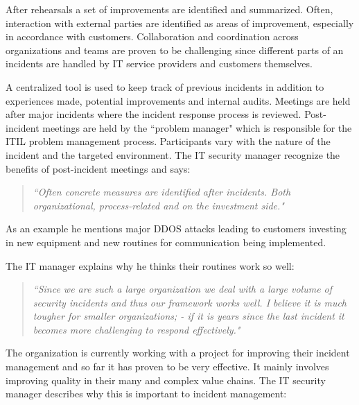 After rehearsals a set of improvements are identified and summarized. Often, interaction with external parties are identified as areas of improvement, especially in accordance with customers. Collaboration and coordination across organizations and teams are proven to be challenging since different parts of an incidents are handled by IT service providers and customers themselves. 

A centralized tool is used to keep track of previous incidents in addition to experiences made, potential improvements and internal audits. Meetings are held after major incidents where the incident response process is reviewed. Post-incident meetings are held by the ``problem manager" which is responsible for the ITIL problem management process. Participants vary with the nature of the incident and the targeted environment. The IT security manager recognize the benefits of post-incident meetings and says:

\begin{quote}
\textit{``Often concrete measures are identified after incidents. Both organizational, process-related and on the investment side."}
\end{quote}

As an example he mentions major DDOS attacks leading to customers investing in new equipment and new routines for communication being implemented. 


The IT manager explains why he thinks their routines work so well:

\begin{quote}
\textit{``Since we are such a large organization we deal with a large volume of security incidents and thus our framework works well. I believe it is much tougher for smaller organizations; - if it is years since the last incident it becomes more challenging to respond effectively."}
\end{quote}

The organization is currently working with a project for improving their incident management and so far it has proven to be very effective. It mainly involves improving quality in their many and complex value chains. The IT security manager describes why this is important to incident management:

